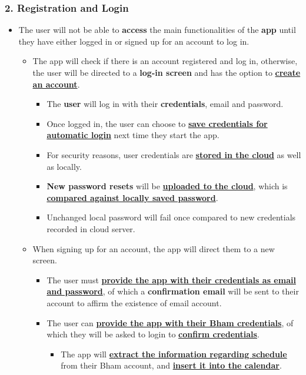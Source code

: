 \documentclass[a4paper,11pt]{article} %
\begin{document}
\subsubsection*{2. Registration and Login}
\begin{itemize}
  \item The user will not be able to \textbf{access} the main functionalities of the \textbf{app} until they have either logged in or signed up for an account to log in.
  \begin{itemize}
    \item The app will check if there is an account registered and log in, otherwise, the user will be directed to a \textbf{log-in screen} and has the option to \textbf{\underline{create an account}}.
    \begin{itemize}
      \item The \textbf{user} will log in with their \textbf{credentials}, email and password.
      \item Once logged in, the user can choose to \textbf{\underline{save credentials for automatic login}} next time they start the app.
      \item For security reasons, user credentials are \textbf{\underline{stored in the cloud}} as well as locally.
      \item \textbf{New password resets} will be \textbf{\underline{uploaded to the cloud}}, which is\\ \textbf{\underline{compared against locally saved password}}.
      \item Unchanged local password will fail once compared to new credentials recorded in cloud server.
    \end{itemize}
    \item When signing up for an account, the app will direct them to a new screen.
    \begin{itemize}
      \item The user must \textbf{\ul{provide the app with their credentials as email and password}}, of which a \textbf{confirmation email} will be sent to their account to affirm the existence of email account.
      \item The user can \textbf{\ul{provide the app with their Bham credentials}}, of which they will be asked to login to \textbf{\underline{confirm credentials}}.
      \begin{itemize}
        \item The app will \textbf{\ul{extract the information regarding schedule}} from their Bham account, and \textbf{\underline{insert it into the calendar}}.

\end{itemize}
\end{itemize}
\end{itemize}
\end{itemize}
\end{document}
